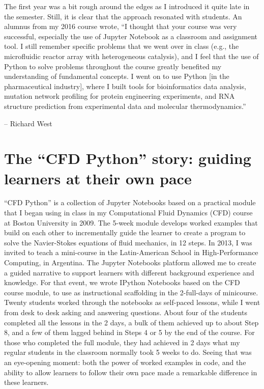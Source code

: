 \documentclass[]{book}
\begin{document}
The first year was a bit rough around the edges as I introduced it quite
late in the semester. Still, it is clear that the approach resonated
with students. An alumnus from my 2016 course wrote, ``I thought that
your course was very successful, especially the use of Jupyter Notebook
as a classroom and assignment tool. I still remember specific problems
that we went over in class (e.g., the microfluidic reactor array with
heterogeneous catalysis), and I feel that the use of Python to solve
problems throughout the course greatly benefited my understanding of
fundamental concepts. I went on to use Python {[}in the pharmaceutical
industry{]}, where I built tools for bioinformatics data analysis,
mutation network profiling for protein engineering experiments, and RNA
structure prediction from experimental data and molecular
thermodynamics.''

-- Richard West

\section{\texorpdfstring{The ``CFD Python'' story: guiding learners at
their own
pace}{The CFD Python story: guiding learners at their own pace}}\label{the-cfd-python-story-guiding-learners-at-their-own-pace}

``CFD Python'' is a collection of Jupyter Notebooks based on a practical
module that I began using in class in my Computational Fluid Dynamics
(CFD) course at Boston University in 2009. The 5-week module develops
worked examples that build on each other to incrementally guide the
learner to create a program to solve the Navier-Stokes equations of
fluid mechanics, in 12 steps. In 2013, I was invited to teach a
mini-course in the Latin-American School in High-Performance Computing,
in Argentina. The Jupyter Notebooks platform allowed me to create a
guided narrative to support learners with different background
experience and knowledge. For that event, we wrote IPython Notebooks
based on the CFD course module, to use as instructional scaffolding in
the 2-full-days of minicourse. Twenty students worked through the
notebooks as self-paced lessons, while I went from desk to desk asking
and answering questions. About four of the students completed all the
lessons in the 2 days, a bulk of them achieved up to about Step 8, and a
few of them lagged behind in Steps 4 or 5 by the end of the course. For
those who completed the full module, they had achieved in 2 days what my
regular students in the classroom normally took 5 weeks to do. Seeing
that was an eye-opening moment: both the power of worked examples in
code, and the ability to allow learners to follow their own pace made a
remarkable difference in these learners.
\end{document}
